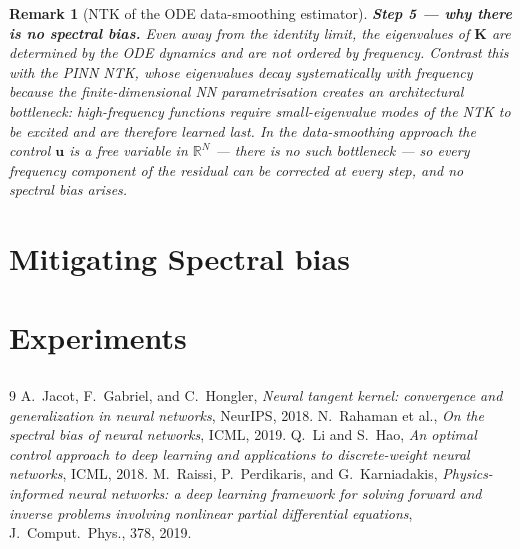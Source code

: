\documentclass{article}
\newtheorem{remark}{Remark}
\begin{document}
\begin{remark}[NTK of the ODE data-smoothing estimator]
\medskip
\noindent\textbf{Step 5 — why there is no spectral bias.}
Even away from the identity limit, the eigenvalues of $\mathbf{K}$ are
determined by the ODE dynamics and are \emph{not ordered by frequency}.
Contrast this with the PINN NTK, whose eigenvalues decay systematically with
frequency because the finite-dimensional NN parametrisation creates an
architectural bottleneck: high-frequency functions require small-eigenvalue
modes of the NTK to be excited and are therefore learned last.
In the data-smoothing approach the control $\mathbf{u}$ is a free variable in
$\mathbb{R}^N$ — there is no such bottleneck — so every frequency component
of the residual can be corrected at every step, and no spectral bias arises.
\end{remark}

\section{Mitigating Spectral bias}

\section{Experiments}

\subsection{}

\begin{thebibliography}{9}
        A.\ Jacot, F.\ Gabriel, and C.\ Hongler,
        \emph{Neural tangent kernel: convergence and generalization in neural
        networks}, NeurIPS, 2018.
        N.\ Rahaman et al.,
        \emph{On the spectral bias of neural networks},
        ICML, 2019.
        Q.\ Li and S.\ Hao,
        \emph{An optimal control approach to deep learning and applications to
        discrete-weight neural networks}, ICML, 2018.
        M.\ Raissi, P.\ Perdikaris, and G.\ Karniadakis,
        \emph{Physics-informed neural networks: a deep learning framework for
        solving forward and inverse problems involving nonlinear partial
        differential equations}, J.\ Comput.\ Phys., 378, 2019.
\end{thebibliography}
\end{document}
